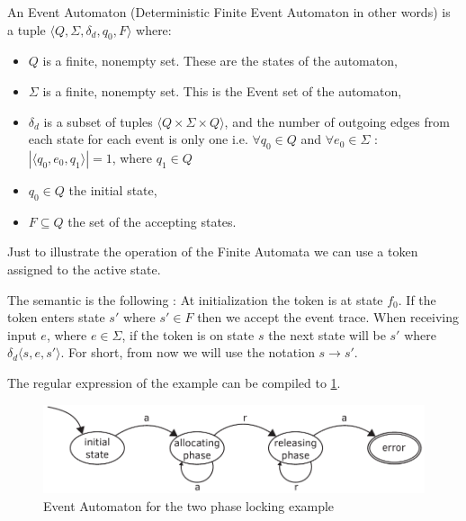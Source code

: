 				
				\begin{dfn}
					\label{dfn:cep:ea}
					An Event Automaton (Deterministic Finite Event Automaton in other words) is a tuple $\langle Q,\Sigma,\delta_d,q_0, F \rangle$  where: 
						\begin{itemize}
							\item $Q$ is a finite, nonempty set. These are the states of the automaton,
							\item $\Sigma$ is a finite, nonempty set. This is the Event set of the automaton,
							\item $\delta_d$ is a subset of tuples $\langle Q \times \Sigma \times Q \rangle$,
								and the number of outgoing edges from each state for each event is only one 
								i.e. $\forall q_0 \in Q$ and $\forall e_0 \in \Sigma$ : $|\langle q_0, e_0, q_1 \rangle| = 1$, where $q_1 \in Q$ 
							\item $q_0 \in Q$ the initial state,
							\item $F \subseteq Q$ the set of the accepting states.
						\end{itemize}	
				\end{dfn}
				
				Just to illustrate the operation of the Finite Automata we can use a token assigned to the active state.

				The semantic is the following : 
				At initialization the token is at state $f_0$.
				If the token enters state $s'$ where $s' \in F$ then we accept the event trace. 
				When receiving input $e$, where $e \in \Sigma$, if the token is on state $s$ the next state will be $s'$ where %
				$\delta_d \langle s,e,s' \rangle$. For short, from now we will use the notation $s \rightarrow s'$. 
				
				The regular expression of the example can be compiled to \cref{fig:cep:fa}.
				
				\begin{figure}[h]
				\centering
				\includegraphics[width=0.7\linewidth]{include/figures/chapter_5/illustration_1}
				\caption{Event Automaton for the two phase locking example}
				\label{fig:cep:fa}
				\end{figure}
				
				

